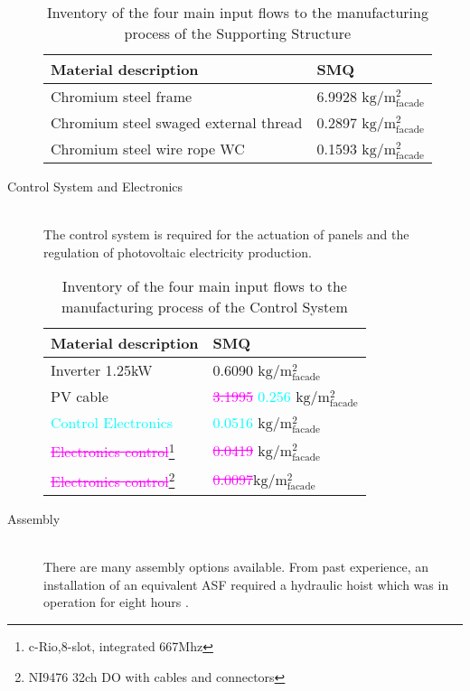 \begin{description}
\begin{table}[H]
\centering
\begin{tabular}{ll}
\hline
Material description & SMQ \\ \hline
Chromium steel frame & 6.9928 ${\mathrm{kg/m^2_{facade}}}$ \\
Chromium steel swaged external thread  &0.2897 ${\mathrm{kg/m^2_{facade}}}$\\
Chromium steel wire rope WC  & 0.1593 ${\mathrm{kg/m^2_{facade}}}$\\
\hline
\end{tabular}
\caption{Inventory of the four main input flows to the manufacturing process of the Supporting Structure}
\label{tab:StructureInv}
\end{table}

\item[Control System and Electronics] \hfill \\
The control system is required for the actuation of panels and the regulation of photovoltaic electricity production.\\

\begin{table}[H]
\centering
\begin{tabular}{ll}
\hline
Material description & SMQ \\ \hline
Inverter 1.25kW	 & 0.6090 ${\mathrm{kg/m^2_{facade}}}$ \\
PV cable  &  \textcolor{magenta}{\sout{3.1995}} \textcolor{cyan}{0.256} ${\mathrm{kg/m^2_{facade}}}$\\
\textcolor{cyan}{Control Electronics} & \textcolor{cyan}{0.0516} ${\mathrm{kg/m^2_{facade}}}$\\
\textcolor{magenta}{\sout{Electronics control}}\footnote{c-Rio,8-slot, integrated 667Mhz}& \textcolor{magenta}{\sout{0.0419}} ${\mathrm{kg/m^2_{facade}}}$\\
\textcolor{magenta}{\sout{Electronics control}}\footnote{NI9476 32ch DO with cables and connectors}& \textcolor{magenta}{\sout{0.0097}}${\mathrm{kg/m^2_{facade}}}$\\
\hline
\end{tabular}
\caption{Inventory of the four main input flows to the manufacturing process of the Control System}
\label{tab:ControlInv}
\end{table}

\item[Assembly] \hfill \\
There are many assembly options available. From past experience, an installation of an equivalent ASF required a hydraulic hoist which was in operation for eight hours \cite{jayathissa2015abs}. \\


\end{description}
